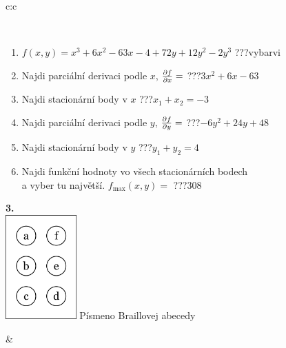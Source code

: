 \documentclass[10pt]{report}
\begin{document}
\begin{tabular}{c:c}
\begin{minipage}[c][104.5mm][t]{0.5\linewidth}
\begin{center}
\begin{minipage}{0.95\linewidth}
\begin{center}
\end{center}
\end{minipage}
\\[1mm]
\begin{minipage}{0.79\linewidth}
\begin{center}
\begin{varwidth}{\linewidth}
\begin{enumerate}
\normalsize
\item $f(x,y)=x^3+6x^2-63x-4+72y+12y^2-2y^3$\quad \dotfill\; ???\;\dotfill \quad vybarvi
\item Najdi parciální derivaci podle $x$, $\pdv{f}{x}=$\quad \dotfill\; ???\;\dotfill \quad $3x^2+6x-63$
\item Najdi stacionární body v $x$\quad \dotfill\; ???\;\dotfill \quad $x_1+x_2=-3$
\item Najdi parciální derivaci podle $y$, $\pdv{f}{y}=$\quad \dotfill\; ???\;\dotfill \quad $-6y^2+24y+48$
\item Najdi stacionární body v $y$\quad \dotfill\; ???\;\dotfill \quad $y_1+y_2=4$
\item Najdi funkční hodnoty vo všech stacionárních bodech \\ \phantom{xxxxxx} a vyber tu najvětší. $f_{\text{max}}(x,y)=$\quad \dotfill\; ???\;\dotfill \quad $308$
\end{enumerate}
\end{varwidth}
\end{center}
\end{minipage}
\begin{minipage}{0.20\linewidth}
\begin{center}
{\Huge\bfseries 3.} \\[2mm]
\includegraphics[height=40mm]{../images/braille.png}
{\small Písmeno Braillovej abecedy}
\end{center}
\end{minipage}
\end{center}
\end{minipage}
&
\begin{minipage}[c][104.5mm][t]{0.5\linewidth}
\begin{center}

\end{center}
\end{minipage}
\end{tabular}
\end{document}
